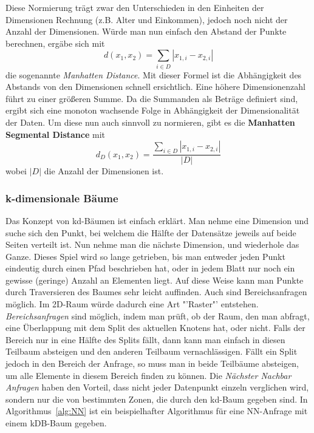 Diese Normierung trägt zwar den Unterschieden in den Einheiten der Dimensionen
Rechnung (z.B. Alter und Einkommen), jedoch noch nicht der Anzahl der Dimensionen.
Würde man nun einfach den Abstand der Punkte berechnen, ergäbe sich mit
\[
	d(x_1, x_2) = \sum\limits_{i\in D} |x_{1,i} - x_{2,i}|
\]
die sogenannte \textit{Manhatten Distance}. Mit dieser Formel ist die Abhängigkeit
des Abstands von den Dimensionen schnell ersichtlich.
Eine höhere Dimensionenzahl führt zu einer größeren Summe. Da die Summanden als
Beträge definiert sind, ergibt sich eine monoton wachsende Folge in Abhängigkeit der
Dimensionalität der Daten. Um diese nun auch sinnvoll zu normieren, gibt
es die \textbf{Manhatten Segmental Distance} mit
\[
	d_D(x_1, x_2) = \frac{\sum\limits_{i\in D} |x_{1,i} - x_{2,i}|}{|D|}
\]
wobei \(|D|\) die Anzahl der Dimensionen ist.

\subsubsection{k-dimensionale Bäume}
Das Konzept von kd-Bäumen ist einfach erklärt. Man nehme eine Dimension und suche
sich den Punkt, bei welchem die Hälfte der Datensätze jeweils auf beide Seiten
verteilt ist. Nun nehme man die nächste Dimension, und wiederhole das Ganze. Dieses
Spiel wird so lange getrieben, bis man entweder jeden Punkt eindeutig durch
einen Pfad beschrieben hat, oder in jedem Blatt nur noch ein gewisse (geringe) 
Anzahl an Elementen liegt. Auf diese Weise kann man Punkte durch Traversieren
des Baumes sehr leicht auffinden. Auch sind Bereichsanfragen möglich. 
Im 2D-Raum würde dadurch eine Art "'Raster"' entstehen.
\textit{Bereichsanfragen} sind möglich, indem man prüft, ob der Raum, den man abfragt,
eine Überlappung mit dem Split des aktuellen Knotens hat, oder nicht. Falls
der Bereich nur in eine Hälfte des Splits fällt, dann kann man einfach in diesen Teilbaum
absteigen und den anderen Teilbaum vernachlässigen. Fällt ein Split jedoch
in den Bereich der Anfrage, so muss man in beide Teilbäume absteigen, um alle
Elemente in diesem Bereich finden zu können.
Die \textit{Nächster Nachbar Anfragen} haben den Vorteil, dass nicht jeder Datenpunkt
einzeln verglichen wird, sondern nur die von bestimmten Zonen, die durch den
kd-Baum gegeben sind. In Algorithmus~\ref{alg:NN} ist ein beispielhafter Algorithmus
für eine NN-Anfrage mit einem kDB-Baum gegeben.


